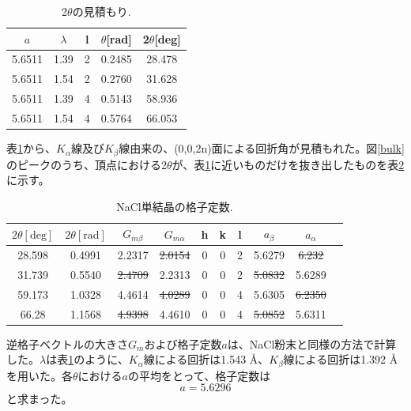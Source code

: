 \documentclass[11pt,a4j,uplatex]{jsarticle}
\begin{document}
\begin{table}[htbp]
 \begin{center}
  \caption{2$\theta$の見積もり.}
  \begin{tabular}{|c|c|c|c|c|}\hline
   $a$        & $\lambda$ & l & $\theta$[rad] & 2$\theta$[deg] \\  \hline  \hline
   5.6511 & 1.39 & 2 & 0.2485 & 28.478\\
 5.6511 & 1.54 & 2 & 0.2760& 31.628\\
 5.6511 & 1.39 & 4 & 0.5143 & 58.936\\
 5.6511 & 1.54 & 4 & 0.5764 & 66.053\\
 \hline
  \end{tabular}
  \label{gyakusan}
 \end{center}
\end{table}

\newpage
表\ref{gyakusan}から、$K_\alpha$線及び$K_\beta$線由来の、(0,0,2n)面による回折角が見積もれた。図\ref{bulk}のピークのうち、頂点における2$\theta$が、表\ref{gyakusan}に近いものだけを抜き出したものを表\ref{crystal}に示す。

\begin{table}[htbp]
 \begin{center}
  \caption{NaCl単結晶の格子定数.}
  \begin{tabular}{|c|c|c|c|ccc|c|c|c|}  \hline
   $2\theta[\mathrm{deg}]$ & $2\theta[\mathrm{rad}]$ & $G_{m\beta}$       & $G_{m\alpha}$      & h & k & l & $a_\beta$          & $a_\alpha$         \\   \hline  \hline
   28.598 & 0.4991 & 2.2317 & \sout{2.0154} & 0 & 0 & 2 & 5.6279 & \sout{6.232}\\
 31.739 & 0.5540 & \sout{2.4709} & 2.2313 & 0 & 0 & 2 & \sout{5.0832} & 5.6289\\
  59.173 & 1.0328 & 4.4614 & \sout{4.0289} & 0 & 0 & 4 & 5.6305 & \sout{6.2350}\\
  66.28 & 1.1568 & \sout{4.9398} & 4.4610 & 0 & 0 & 4 & \sout{5.0852} & 5.6311\\
  \hline
  \end{tabular}
  \label{crystal}
 \end{center}
\end{table}

逆格子ベクトルの大きさ$G_m$および格子定数$a$は、NaCl粉末と同様の方法で計算した。$\lambda$は表\ref{gyakusan}のように、$K_\alpha$線による回折は1.543 \AA 、$K_\beta$線による回折は1.392 \AA を用いた。各$\theta$における$a$の平均をとって、格子定数は
\begin{equation}
 \nonumber
 a=5.6296
 \label{complete2}
\end{equation}
と求まった。
\end{document}
